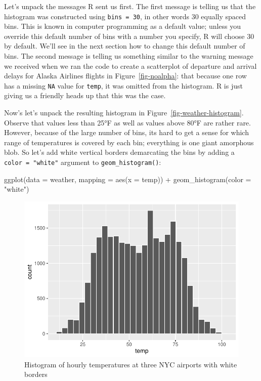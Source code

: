\documentclass[
  letterpaper,
  DIV=11,
  numbers=noendperiod]{scrreprt}
\newenvironment{Shaded}{\begin{snugshade}}{\end{snugshade}}
\newcommand{\AttributeTok}[1]{\textcolor[rgb]{0.40,0.45,0.13}{#1}}
\newcommand{\FunctionTok}[1]{\textcolor[rgb]{0.28,0.35,0.67}{#1}}
\newcommand{\NormalTok}[1]{\textcolor[rgb]{0.00,0.23,0.31}{#1}}
\newcommand{\SpecialCharTok}[1]{\textcolor[rgb]{0.37,0.37,0.37}{#1}}
\newcommand{\StringTok}[1]{\textcolor[rgb]{0.13,0.47,0.30}{#1}}
\theoremstyle{definition}
\theoremstyle{remark}
\begin{document}
Let's unpack the messages R sent us first. The first message is telling
us that the histogram was constructed using \texttt{bins\ =\ 30}, in
other words 30 equally spaced bins. This is known in computer
programming as a default value; unless you override this default number
of bins with a number you specify, R will choose 30 by default. We'll
see in the next section how to change this default number of bins. The
second message is telling us something similar to the warning message we
received when we ran the code to create a scatterplot of departure and
arrival delays for Alaska Airlines flights in Figure~\ref{fig-noalpha}:
that because one row has a missing \texttt{NA} value for \texttt{temp},
it was omitted from the histogram. R is just giving us a friendly heads
up that this was the case.

Now's let's unpack the resulting histogram in
Figure~\ref{fig-weather-histogram}. Observe that values less than 25°F
as well as values above 80°F are rather rare. However, because of the
large number of bins, its hard to get a sense for which range of
temperatures is covered by each bin; everything is one giant amorphous
blob. So let's add white vertical borders demarcating the bins by adding
a \texttt{color\ =\ "white"} argument to \texttt{geom\_histogram()}:

\begin{Shaded}
\begin{Highlighting}[]
\FunctionTok{ggplot}\NormalTok{(}\AttributeTok{data =}\NormalTok{ weather, }\AttributeTok{mapping =} \FunctionTok{aes}\NormalTok{(}\AttributeTok{x =}\NormalTok{ temp)) }\SpecialCharTok{+}
  \FunctionTok{geom\_histogram}\NormalTok{(}\AttributeTok{color =} \StringTok{"white"}\NormalTok{)}
\end{Highlighting}
\end{Shaded}

\begin{figure}[H]

{\centering \includegraphics{02-visualization_files/figure-pdf/fig-weather-histogram-2-1.pdf}

}

\caption{\label{fig-weather-histogram-2}Histogram of hourly temperatures
at three NYC airports with white borders}

\end{figure}
\end{document}
